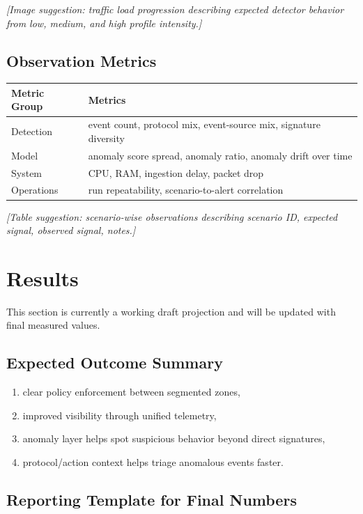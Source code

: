 \documentclass[12pt,a4paper]{article}
\begin{document}
\textit{[Image suggestion: traffic load progression describing expected detector behavior from low, medium, and high profile intensity.]}

\subsection{Observation Metrics}

\begin{table}[h!]
\centering
\begin{tabular}{ll}
\toprule
Metric Group & Metrics \\
\midrule
Detection & event count, protocol mix, event-source mix, signature diversity \\
Model & anomaly score spread, anomaly ratio, anomaly drift over time \\
System & CPU, RAM, ingestion delay, packet drop \\
Operations & run repeatability, scenario-to-alert correlation \\
\bottomrule
\end{tabular}
\end{table}

\textit{[Table suggestion: scenario-wise observations describing scenario ID, expected signal, observed signal, notes.]}

\section{Results}

This section is currently a working draft projection and will be updated with final measured values.

\subsection{Expected Outcome Summary}
\begin{enumerate}
    \item clear policy enforcement between segmented zones,
    \item improved visibility through unified telemetry,
    \item anomaly layer helps spot suspicious behavior beyond direct signatures,
    \item protocol/action context helps triage anomalous events faster.
\end{enumerate}

\subsection{Reporting Template for Final Numbers}
\end{document}
